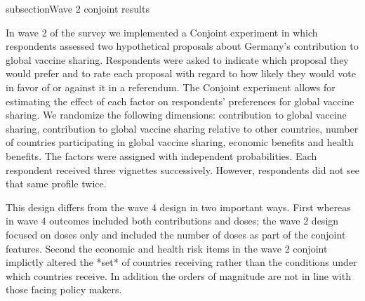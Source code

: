 \documentclass[12pt,oneside,smallheadings,chapterprefix=true]{article}
\begin{document}
subsection{Wave 2 conjoint results}

In wave 2 of the survey we implemented a Conjoint experiment in which respondents assessed two hypothetical proposals about Germany's contribution to global vaccine sharing. Respondents were asked  to indicate which proposal they would prefer and to rate each proposal with regard to how likely they would vote in favor of or against it in a referendum. The Conjoint experiment allows for estimating the effect of each factor on respondents' preferences for global vaccine sharing. We randomize the following dimensions: contribution to global vaccine sharing, contribution to global vaccine sharing relative to other countries, number of countries participating in global vaccine sharing, economic benefits and health benefits. The factors were assigned with independent probabilities. Each respondent received three vignettes successively. However, respondents did not see that same profile twice. 

This design differs from the wave 4 design in two important ways. First whereas in wave 4 outcomes included both contributions and doses; the wave 2 design focused on doses only and included the number of doses as part of the conjoint features. Second the economic and health risk items in the wave 2 conjoint implictly altered the *set* of countries receiving rather than the conditions under which countries receive. In addition the orders of magnitude are not in line with those facing policy makers. 
\end{document}
